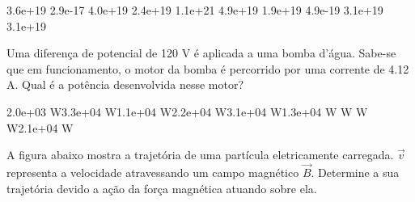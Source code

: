 \documentclass[12pt, addpoints]{exam}
\begin{document}
\begin{questions}
\begin{multicols*}{2}
\begin{oneparchoices}
\choice 3.6e+19 \choice 2.9e-17 \choice 4.0e+19 \choice 2.4e+19 \choice 1.1e+21 \choice 4.9e+19 \choice 1.9e+19 \choice 4.9e-19 \choice 3.1e+19 \choice 3.1e+19 
\end{oneparchoices}\question Uma diferença de potencial de 120 V é aplicada a uma bomba d’água. Sabe-se que em funcionamento, o motor da bomba é percorrido por uma corrente de    4.12 A. Qual é a potência desenvolvida nesse motor?

\begin{oneparchoices}
\choice 2.0e+03 W\choice 3.3e+04 W\choice 1.1e+04 W\choice 2.2e+04 W\choice 3.1e+04 W\choice 1.3e+04 W W W W\choice 2.1e+04 W
\end{oneparchoices}\question A ﬁgura abaixo mostra a trajetória de uma partícula eletricamente carregada. $\vec{{v}}$ representa a velocidade atravessando um campo magnético $\vec{{B}}$. Determine a sua trajetória devido a ação da força magnética atuando sobre ela.
        
        \begin{center}
            \begin{minipage}[c]{0.5\linewidth}
            \end{minipage}
        \end{center}

        


\end{multicols*}
\end{questions}
\end{document}
